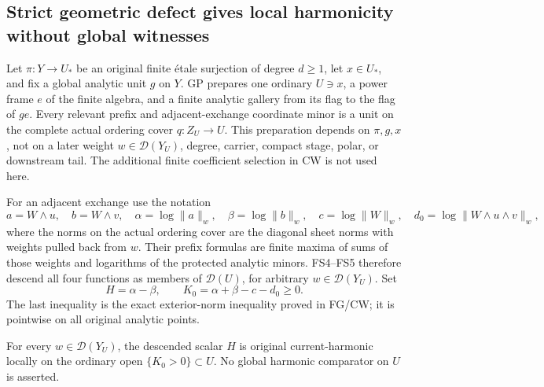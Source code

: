 \subsection{Strict geometric defect gives local harmonicity without global witnesses}

Let \(\pi:Y\to U_*\) be an original finite \'{e}tale surjection
of degree \(d\ge1\), let \(x\in U_*\), and fix a global analytic
unit \(g\) on \(Y\). GP prepares one ordinary \(U\ni x\),
a power frame \(e\) of the finite algebra, and a finite analytic
gallery from its flag to the flag of \(ge\).
Every relevant prefix and adjacent-exchange coordinate minor is
a unit on the complete actual ordering cover \(q:Z_U\to U\).
This preparation depends on \(\pi,g,x\), not on a later weight
\(w\in\mathcal D(Y_U)\), degree, carrier, compact stage, polar,
or downstream tail. The additional finite coefficient selection
in CW is not used here.

For an adjacent exchange use the notation
\[
 a=W\wedge u,\quad b=W\wedge v,\quad
 \alpha=\log\|a\|_w,\quad \beta=\log\|b\|_w,\quad
 c=\log\|W\|_w,\quad d_0=\log\|W\wedge u\wedge v\|_w,
                                                               \tag{LC24.3}
\]
where the norms on the actual ordering cover are the diagonal
sheet norms with weights pulled back from \(w\). Their prefix
formulas are finite maxima of sums of those weights and logarithms
of the protected analytic minors. FS4--FS5 therefore descend all
four functions as members of \(\mathcal D(U)\), for arbitrary
\(w\in\mathcal D(Y_U)\).
Set
\[
                         H=\alpha-\beta,\qquad
                         K_0=\alpha+\beta-c-d_0\ge0.        \tag{LC24.4}
\]
The last inequality is the exact exterior-norm inequality proved
in FG/CW; it is pointwise on all original analytic points.

\begin{lemma}
For every \(w\in\mathcal D(Y_U)\), the descended scalar \(H\)
is original current-harmonic locally on the ordinary open
\(\{K_0>0\}\subset U\). No global harmonic comparator on \(U\)
is asserted.
\end{lemma}

